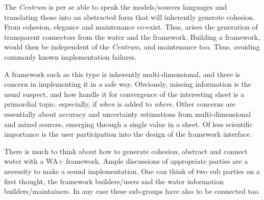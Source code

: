 \documentclass[a4paper,10pt,onecolumn]{article}
\begin{document}
The {\it Centrum} is per se able to speak the models/sources languages and translating those into an abstracted form
that will inherently generate cohesion. From cohesion, elegance and maintenance co-exist. Thus, arises the generation
of transparent connectors from the water and the framework. Building a framework, would then be independent of the 
{\it Centrum}, and maintenance too. Thus, avoiding commonly known implementation failures.\newline

A framework such as this type is inherently multi-dimensional, and there is concern in implementing it in a safe way.
Obviously, missing information is the usual suspect, and how handle it for convergence of the interesting sheet is a
primordial topic. especially, if {\it when} is added to {\it where}. Other concerns are essentially about accuracy 
and uncertainty estimations from multi-dimensional and mixed sources, emerging through a single value in a sheet.
Of less scientific importance is the user participation into the design of the framework interface.\newline

There is much to think about how to generate cohesion, abstract and connect water with a WA+ framework. 
Ample discussions of appropriate parties are a necessity to make a sound implementation. One can think of 
two sub parties on a first thought, the framework builders/users and the water information builders/maintainers.
In any case these sub-groups have also to be connected too.
\end{document}
